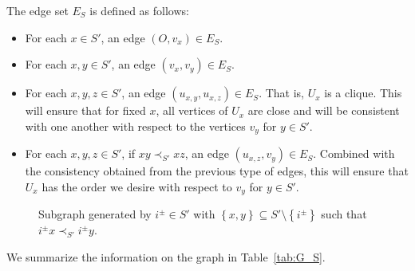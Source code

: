 \documentclass[11pt, letter]{article}
\theoremstyle{remark}
\newcommand{\set}[1]{\left\{#1\right\}}
\begin{document}
The edge set $E_S$ is defined as follows:

\begin{itemize}
    \item For each $x \in S'$, an edge $(O, v_x) \in E_S$. 
    \item For each $x, y \in S'$, an edge $(v_x, v_y) \in E_S$. 
    \item For each $x, y, z \in S'$, an edge $(u_{x,y}, u_{x,z}) \in E_S$. That is, $U_x$ is a clique. This will ensure that for fixed $x$, all vertices of $U_x$ are close and will be consistent with one another with respect to the vertices $v_y$ for $y\in S'$.
    \item For each $x, y, z \in S'$, if $xy \prec_{S'} xz$, an edge $(u_{x,z}, v_y) \in E_S$. Combined with the consistency obtained from the previous type of edges, this will ensure that $U_x$ has the order we desire with respect to $v_y$ for $y\in S'$.
\end{itemize}


\begin{figure}
    \centering
    \caption{Subgraph generated by $i^\pm\in S'$ with $\set{x,y}\subseteq S'\setminus \set{i^{\pm}}$ such that $i^\pm x\prec_{S'} i^\pm y$.}
    \label{fig:Our Gadget}
\end{figure}

We summarize the information on the graph in Table~\ref{tab:G_S}.
\end{document}
